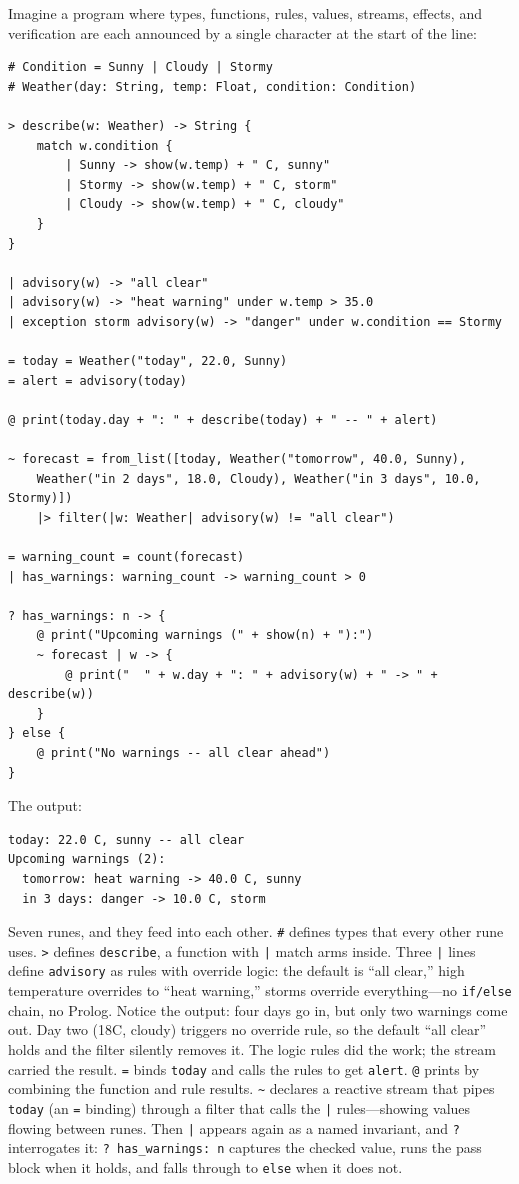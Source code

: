 \documentclass[11pt,a4paper]{article}
\begin{document}
Imagine a program where types, functions, rules, values, streams, effects, and verification are each announced by a single character at the start of the line:

\begin{lstlisting}
# Condition = Sunny | Cloudy | Stormy
# Weather(day: String, temp: Float, condition: Condition)

> describe(w: Weather) -> String {
    match w.condition {
        | Sunny -> show(w.temp) + " C, sunny"
        | Stormy -> show(w.temp) + " C, storm"
        | Cloudy -> show(w.temp) + " C, cloudy"
    }
}

| advisory(w) -> "all clear"
| advisory(w) -> "heat warning" under w.temp > 35.0
| exception storm advisory(w) -> "danger" under w.condition == Stormy

= today = Weather("today", 22.0, Sunny)
= alert = advisory(today)

@ print(today.day + ": " + describe(today) + " -- " + alert)

~ forecast = from_list([today, Weather("tomorrow", 40.0, Sunny),
    Weather("in 2 days", 18.0, Cloudy), Weather("in 3 days", 10.0, Stormy)])
    |> filter(|w: Weather| advisory(w) != "all clear")

= warning_count = count(forecast)
| has_warnings: warning_count -> warning_count > 0

? has_warnings: n -> {
    @ print("Upcoming warnings (" + show(n) + "):")
    ~ forecast | w -> {
        @ print("  " + w.day + ": " + advisory(w) + " -> " + describe(w))
    }
} else {
    @ print("No warnings -- all clear ahead")
}
\end{lstlisting}

\noindent The output:
\begin{verbatim}
today: 22.0 C, sunny -- all clear
Upcoming warnings (2):
  tomorrow: heat warning -> 40.0 C, sunny
  in 3 days: danger -> 10.0 C, storm
\end{verbatim}

Seven runes, and they feed into each other. \texttt{\#} defines types that every other rune uses. \texttt{>} defines \texttt{describe}, a function with \texttt{|} match arms inside. Three \texttt{|} lines define \texttt{advisory} as rules with override logic: the default is ``all clear,'' high temperature overrides to ``heat warning,'' storms override everything---no \texttt{if/else} chain, no Prolog. Notice the output: four days go in, but only two warnings come out. Day two (18\textdegree C, cloudy) triggers no override rule, so the default ``all clear'' holds and the filter silently removes it. The logic rules did the work; the stream carried the result. \texttt{=} binds \texttt{today} and calls the rules to get \texttt{alert}. \texttt{@} prints by combining the function and rule results. \texttt{\textasciitilde} declares a reactive stream that pipes \texttt{today} (an \texttt{=} binding) through a filter that calls the \texttt{|} rules---showing values flowing between runes. Then \texttt{|} appears again as a named invariant, and \texttt{?} interrogates it: \texttt{?~has\_warnings: n} captures the checked value, runs the pass block when it holds, and falls through to \texttt{else} when it does not.
\end{document}
